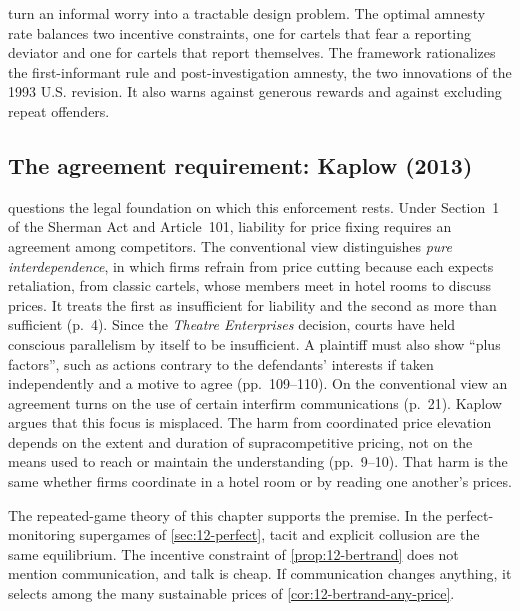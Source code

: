 \citet{ChenRey2013} turn an informal worry into a tractable design problem. The optimal amnesty rate balances two
incentive constraints, one for cartels that fear a reporting deviator and one for cartels that report themselves. The
framework rationalizes the first-informant rule and post-investigation amnesty, the two innovations of the 1993 U.S.
revision. It also warns against generous rewards and against excluding repeat offenders.

\subsection{The agreement requirement: Kaplow (2013)}\label{sec:12-kaplow}

\citet{Kaplow2013} questions the legal foundation on which this enforcement rests. Under Section~1 of the Sherman Act
and Article~101, liability for price fixing requires an agreement among competitors. The conventional view
distinguishes \emph{pure interdependence}, in which firms refrain from price cutting because each expects
retaliation, from classic cartels, whose members meet in hotel rooms to discuss prices. It treats the first as
insufficient for liability and the second as more than sufficient (p.~4). Since the \textit{Theatre Enterprises} decision, courts
have held conscious parallelism by itself to be insufficient. A plaintiff must also show ``plus factors'', such as
actions contrary to the defendants' interests if taken independently and a motive to agree (pp.~109--110). On the
conventional view an agreement turns on the use of certain interfirm communications (p.~21). Kaplow argues that this
focus is misplaced. The harm from coordinated price elevation depends on the extent and duration of supracompetitive
pricing, not on the means used to reach or maintain the understanding (pp.~9--10). That harm is the same whether
firms coordinate in a hotel room or by reading one another's prices.

The repeated-game theory of this chapter supports the premise. In the perfect-monitoring supergames of
\cref{sec:12-perfect}, tacit and explicit collusion are the same equilibrium. The incentive constraint of
\cref{prop:12-bertrand} does not mention communication, and talk is cheap. If communication changes anything, it
selects among the many sustainable prices of \cref{cor:12-bertrand-any-price}.

